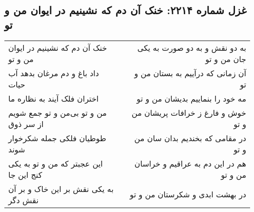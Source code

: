 \begin{center}
\section*{غزل شماره ۲۲۱۴: خنک آن دم که نشینیم در ایوان من و تو}
\label{sec:2214}
\begin{longtable}{l p{0.5cm} r}
خنک آن دم که نشینیم در ایوان من و تو
&&
به دو نقش و به دو صورت به یکی جان من و تو
\\
داد باغ و دم مرغان بدهد آب حیات
&&
آن زمانی که درآییم به بستان من و تو
\\
اختران فلک آیند به نظاره ما
&&
مه خود را بنماییم بدیشان من و تو
\\
من و تو بی‌من و تو جمع شویم از سر ذوق
&&
خوش و فارغ ز خرافات پریشان من و تو
\\
طوطیان فلکی جمله شکرخوار شوند
&&
در مقامی که بخندیم بدان سان من و تو
\\
این عجبتر که من و تو به یکی کنج این جا
&&
هم در این دم به عراقیم و خراسان من و تو
\\
به یکی نقش بر این خاک و بر آن نقش دگر
&&
در بهشت ابدی و شکرستان من و تو
\\
\end{longtable}
\end{center}
